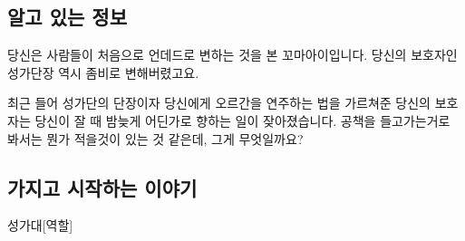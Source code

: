 \documentclass{report}
\begin{document}
	\subsection*{알고 있는 정보}
		당신은 사람들이 처음으로 언데드로 변하는 것을 본 꼬마아이입니다. 당신의 보호자인 성가단장 역시 좀비로 변해버렸고요.
		
		최근 들어 성가단의 단장이자 당신에게 오르간을 연주하는 법을 가르쳐준 당신의 보호자는 당신이 잘 때 밤늦게 어딘가로 향하는 일이 잦아졌습니다. 공책을 들고가는거로 봐서는 뭔가 적을것이 있는 것 같은데, 그게 무엇일까요?
	
	\subsection*{가지고 시작하는 이야기}
		\begin{spoiler}{성가대}{[역할]}
			
			
		\end{spoiler}
	
\end{document}
